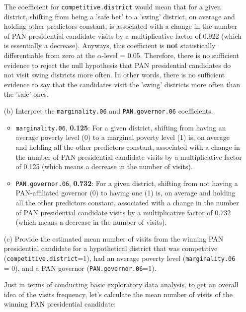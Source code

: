 \documentclass[12pt,letterpaper]{article}
\begin{document}
\begin{enumerate}
The coefficient for \texttt{competitive.district} would mean that for a given district, shifting from being a 'safe bet' to a 'swing' district, on average and holding other predictors constant, is associated with a change in the number of PAN presidential candidate visits by a multiplicative factor of 0.922 (which is essentially a decrease). Anyways, this coefficient
is \textbf{not} statistically differentiable from zero at the $\alpha$-level = 0.05. Therefore, there is no sufficient evidence to reject the null hypothesis that PAN presidential candidates do not visit swing districts more often. In other words, there is no sufficient evidence to say that the candidates visit the 'swing' districts more often than the 'safe' ones.


	\item [(b)]
	Interpret the \texttt{marginality.06} and \texttt{PAN.governor.06} coefficients.
\begin{itemize}
    \item \texttt{marginality.06}, \textbf{0.125}: For a given district, shifting from having an average poverty level (0) to a marginal poverty level (1) is, on average and holding all the other predictors constant, associated with a change in the number of PAN presidential candidate visits by a multiplicative factor of 0.125 (which means a decrease in the number of visits).
    \item \texttt{PAN.governor.06}, \textbf{0.732}: For a given district, shifting from not having a PAN-affiliated governor (0) to having one (1) is, on average and holding all the other predictors constant, associated with a change in the number of PAN presidential candidate visits by a multiplicative factor of 0.732 (which means a decrease in the number of visits).
\end{itemize}


 
	\item [(c)]
	Provide the estimated mean number of visits from the winning PAN presidential candidate for a hypothetical district that was competitive (\texttt{competitive.district}=1), had an average poverty level (\texttt{marginality.06} = 0), and a PAN governor (\texttt{PAN.governor.06}=1).
	
	Just in terms of conducting basic exploratory data analysis, to get an overall idea of the visits frequency, let's calculate the mean number of visits of the winning PAN presidential candidate:
	
		 
	

\end{enumerate}
\end{document}
